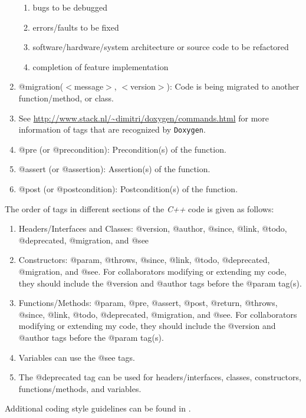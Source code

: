 \documentclass[letter,12pt]{article}
\begin{document}
\begin{enumerate}
	\begin{enumerate} \itemsep -2pt
	\item bugs to be debugged
	\item errors/faults to be fixed
	\item software/hardware/system architecture or source code to be refactored
	\item completion of feature implementation
	\end{enumerate}
\item @migration($<$message$>$, $<$version$>$): Code is being migrated to another function/method, or class.
\item See \url{http://www.stack.nl/~dimitri/doxygen/commands.html} for more information of tags that are recognized by {\tt Doxygen}.
\item @pre (or @precondition): Precondition(s) of the function.
\item @assert (or @assertion): Assertion(s) of the function.
\item @post (or @postcondition): Postcondition(s) of the function.
\end{enumerate}

The order of tags in different sections of the {\it C++} code is given as follows: \vspace{-0.3cm}
\begin{enumerate} \itemsep -4pt
\item Headers/Interfaces and Classes: @version, @author, @since, @link, @todo, @deprecated, @migration, and @see
\item Constructors: @param, @throws, @since, @link, @todo, @deprecated, @migration, and @see. For collaborators modifying or extending my code, they should include the @version and @author tags before the @param tag(s).
\item Functions/Methods: @param, @pre, @assert, @post, @return, @throws, @since, @link, @todo, @deprecated, @migration, and @see. For collaborators modifying or extending my code, they should include the @version and @author tags before the @param tag(s).
\item Variables can use the @see tags.
\item The @deprecated tag can be used for headers/interfaces, classes, constructors, functions/methods, and variables.
\end{enumerate}

Additional coding style guidelines can be found in \cite{Costan2019,Basalaj2013,ProgrammingResearchLtdStaff2013,Thereska20XY,Hoff2008a,ScienceInfusionSoftwareEngineeringProcessGroupStaff2006,Cargill1992,Misfeldt2004}. \\
\end{document}
